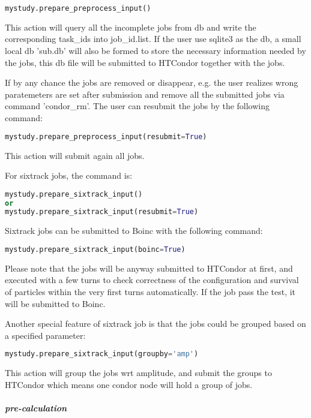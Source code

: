 \begin{lstlisting}[language=Python]
mystudy.prepare_preprocess_input()
\end{lstlisting}

This action will query all the incomplete jobs from db and write the corresponding task\_ids into job\_id.list. If the user use sqlite3 as the db, a small local db 'sub.db' will also be formed to store the necessary information needed by the jobs, this db file will be submitted to HTCondor together with the jobs.

If by any chance the jobs are removed or disappear, e.g. the user realizes wrong paratemeters are set after submission and remove all the submitted jobs via command 'condor\_rm'. The user can resubmit the jobs by the following command:
\begin{lstlisting}[language=Python]
mystudy.prepare_preprocess_input(resubmit=True)
\end{lstlisting}
This action will submit again all jobs.

For sixtrack jobs, the command is:

\begin{lstlisting}[language=Python]
mystudy.prepare_sixtrack_input()
or
mystudy.prepare_sixtrack_input(resubmit=True)
\end{lstlisting}
Sixtrack jobs can be submitted to Boinc with the following command:
\begin{lstlisting}[language=Python]
mystudy.prepare_sixtrack_input(boinc=True)
\end{lstlisting}
Please note that the jobs will be anyway submitted to HTCondor at first, and executed with a few turns to check correctness of the configuration and survival of particles within the very first turns automatically. If the job pass the test, it will be submitted to Boinc.

Another special feature of sixtrack job is that the jobs could be grouped based on a specified parameter:
\begin{lstlisting}[language=Python]
mystudy.prepare_sixtrack_input(groupby='amp')
\end{lstlisting}
This action will group the jobs wrt amplitude, and submit the groups to HTCondor which means one condor node will hold a group of jobs.

\subparagraph{pre-calculation}~

